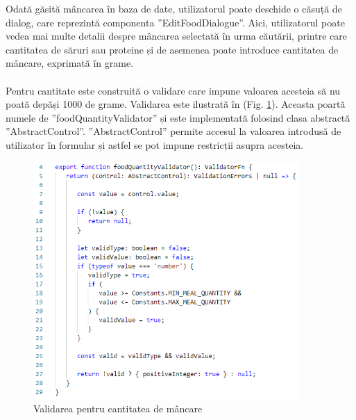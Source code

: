 Odată găsită mâncarea în baza de date, utilizatorul poate deschide o căsuță de dialog, care reprezintă componenta ”EditFoodDialogue”. Aici, utilizatorul poate vedea mai multe detalii despre mâncarea selectată în urma căutării, printre care cantitatea de săruri sau proteine și de asemenea poate introduce cantitatea de mâncare, exprimată în grame.
\\ \\
Pentru cantitate este construită o validare care impune valoarea acesteia să nu poată depăși 1000 de grame. Validarea este ilustrată în (Fig. \ref{fig:69}). Aceasta poartă numele de ”foodQuantityValidator” și este implementată folosind clasa abstractă ”AbstractControl”. ”AbstractControl” permite accesul la valoarea introdusă de utilizator în formular și astfel se pot impune restricții asupra acesteia.

\begin{figure}[!htb]
	\centering
	\includegraphics[width=0.9\textwidth]
	{../LaTeX/Images/implementare_foodqtyvalidator.PNG}
	\caption{Validarea pentru cantitatea de mâncare}
	\label{fig:69}
\end{figure}

